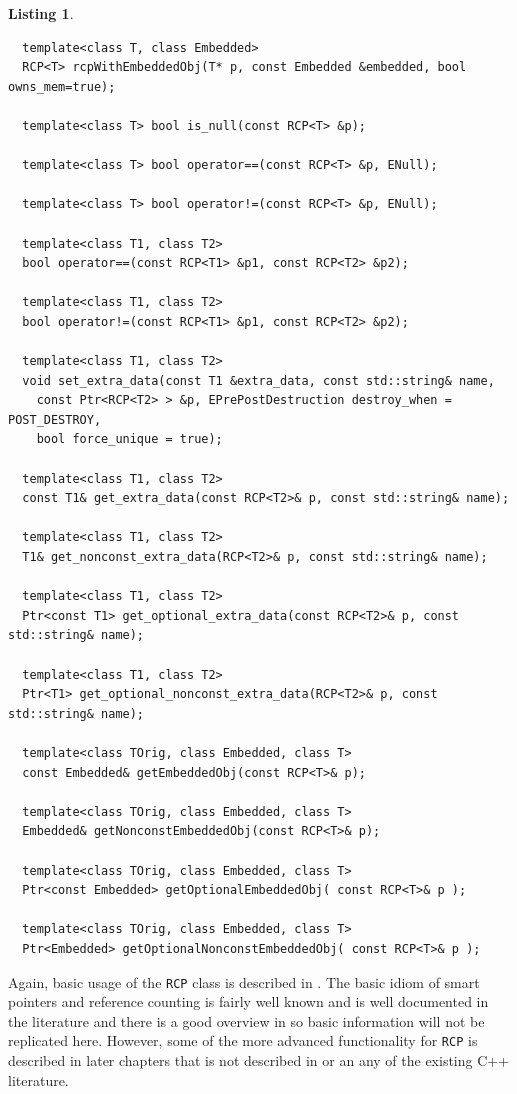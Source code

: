 \documentclass[pdf,ps2pdf,11pt]{SANDreport}
\newtheorem{listing}{Listing}
\begin{document}
\begin{listing}
{\begin{verbatim}
  template<class T, class Embedded>
  RCP<T> rcpWithEmbeddedObj(T* p, const Embedded &embedded, bool owns_mem=true);
  
  template<class T> bool is_null(const RCP<T> &p);
  
  template<class T> bool operator==(const RCP<T> &p, ENull);
  
  template<class T> bool operator!=(const RCP<T> &p, ENull);
  
  template<class T1, class T2>
  bool operator==(const RCP<T1> &p1, const RCP<T2> &p2);
  
  template<class T1, class T2>
  bool operator!=(const RCP<T1> &p1, const RCP<T2> &p2);
  
  template<class T1, class T2>
  void set_extra_data(const T1 &extra_data, const std::string& name,
    const Ptr<RCP<T2> > &p, EPrePostDestruction destroy_when = POST_DESTROY,
    bool force_unique = true);
  
  template<class T1, class T2> 
  const T1& get_extra_data(const RCP<T2>& p, const std::string& name);
  
  template<class T1, class T2>
  T1& get_nonconst_extra_data(RCP<T2>& p, const std::string& name);
  
  template<class T1, class T2>
  Ptr<const T1> get_optional_extra_data(const RCP<T2>& p, const std::string& name);
  
  template<class T1, class T2>
  Ptr<T1> get_optional_nonconst_extra_data(RCP<T2>& p, const std::string& name);
  
  template<class TOrig, class Embedded, class T> 
  const Embedded& getEmbeddedObj(const RCP<T>& p);
  
  template<class TOrig, class Embedded, class T>
  Embedded& getNonconstEmbeddedObj(const RCP<T>& p);
  
  template<class TOrig, class Embedded, class T>
  Ptr<const Embedded> getOptionalEmbeddedObj( const RCP<T>& p );
  
  template<class TOrig, class Embedded, class T>
  Ptr<Embedded> getOptionalNonconstEmbeddedObj( const RCP<T>& p );

\end{verbatim}}
\end{listing}

Again, basic usage of the {}\texttt{RCP} class is described in
{}\cite{RefCountPtrBeginnersGuide}.  The basic idiom of smart pointers and
reference counting is fairly well known and is well documented in the
literature and there is a good overview in {}\cite{RefCountPtrBeginnersGuide}
so basic information will not be replicated here.  However, some of the more
advanced functionality for {}\texttt{RCP} is described in later chapters that
is not described in {}\cite{RefCountPtrBeginnersGuide} or an any of the
existing C++ literature.
\end{document}
